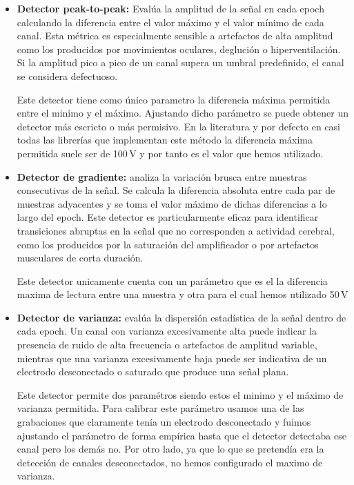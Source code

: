 \begin{itemize}
    \item \textbf{Detector peak-to-peak:} Evalúa la amplitud de la señal en cada epoch calculando la diferencia entre el valor máximo y el valor mínimo de cada canal. Esta métrica es especialmente sensible a artefactos de alta amplitud como los producidos por movimientos oculares, deglución o hiperventilación. Si la amplitud pico a pico de un canal supera un umbral predefinido, el canal se considera defectuoso. 
    
    Este detector tiene como único parametro la diferencia máxima permitida entre el minimo y el máximo. Ajustando dicho parámetro se puede obtener un detector más escricto o más permisivo. En la literatura y por defecto en casi todas las librerías que implementan este método la diferencia máxima permitida suele ser de 100\,\textmu V y por tanto es el valor que hemos utilizado. 

    \item \textbf{Detector de gradiente:} analiza la variación brusca entre muestras consecutivas de la señal. Se calcula la diferencia absoluta entre cada par de muestras adyacentes y se toma el valor máximo de dichas diferencias a lo largo del epoch. Este detector es particularmente eficaz para identificar transiciones abruptas en la señal que no corresponden a actividad cerebral, como los producidos por la saturación del amplificador o por artefactos musculares de corta duración.
    
    Este detector unicamente cuenta con un parámetro que es el la diferencia maxima de lectura entre una muestra y otra para el cual hemos utilizado 50\,\textmu V

    \item \textbf{Detector de varianza:} evalúa la dispersión estadística de la señal dentro de cada epoch. Un canal con varianza excesivamente alta puede indicar la presencia de ruido de alta frecuencia o artefactos de amplitud variable, mientras que una varianza excesivamente baja puede ser indicativa de un electrodo desconectado o saturado que produce una señal plana. 

    Este detector permite dos paramétros siendo estos el minimo y el máximo de varianza permitida. Para calibrar este parámetro usamos una de las grabaciones que claramente tenía un electrodo desconectado y fuimos ajustando el parámetro de forma empírica hasta que el detector detectaba ese canal pero los demás no. Por otro lado, ya que lo que se pretendía era la detección de canales desconectados, no hemos configurado el maximo de varianza.
\end{itemize}

